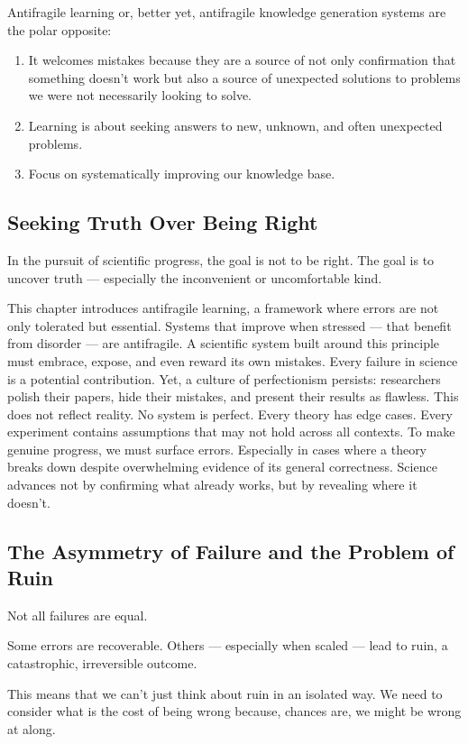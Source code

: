 Antifragile learning or, better yet, antifragile knowledge generation systems are the polar opposite:
\begin{enumerate}
	\item It welcomes mistakes because they are a source of not only confirmation that something doesn't work but also a source of unexpected solutions to problems we were not necessarily looking to solve.
	\item Learning is about seeking answers to new, unknown, and often unexpected problems.
	\item Focus on systematically improving our knowledge base.
\end{enumerate}


\subsection{Seeking Truth Over Being Right}

In the pursuit of scientific progress, the goal is not to be right. The goal is to uncover truth — especially the inconvenient or uncomfortable kind.

This chapter introduces antifragile learning, a framework where errors are not only tolerated but essential. Systems that improve when stressed — that benefit from disorder — are antifragile. A scientific system built around this principle must embrace, expose, and even reward its own mistakes. Every failure in science is a potential contribution. Yet, a culture of perfectionism persists: researchers polish their papers, hide their mistakes, and present their results as flawless. This does not reflect reality. No system is perfect. Every theory has edge cases. Every experiment contains assumptions that may not hold across all contexts. To make genuine progress, we must surface errors. Especially in cases where a theory breaks down despite overwhelming evidence of its general correctness. Science advances not by confirming what already works, but by revealing where it doesn't.

\subsection{The Asymmetry of Failure and the Problem of Ruin}

Not all failures are equal. 

Some errors are recoverable. Others — especially when scaled — lead to ruin, a catastrophic, irreversible outcome.

This means that we can't just think about ruin in an isolated way. We need to consider what is the cost of being wrong because, chances are, we might be wrong at along.

